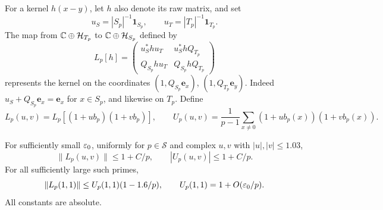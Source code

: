 For a kernel \(h(x-y)\), let \(h\) also denote its raw matrix, and set
\[
 u_S=|S_p|^{-1}\mathbf1_{S_p},\qquad
 u_T=|T_p|^{-1}\mathbf1_{T_p}.
\]
The map from \(\mathbb C\oplus\mathcal H_{T_p}\) to
\(\mathbb C\oplus\mathcal H_{S_p}\) defined by
\[
 L_p[h]=
 \begin{pmatrix}
 u_S^*hu_T&u_S^*hQ_{T_p}\\
 Q_{S_p}hu_T&Q_{S_p}hQ_{T_p}
 \end{pmatrix}
\]
represents the kernel on the coordinates
\((1,Q_{S_p}\mathbf e_x)\), \((1,Q_{T_p}\mathbf e_y)\).
Indeed \(u_S+Q_{S_p}\mathbf e_x=\mathbf e_x\) for \(x\in S_p\),
and likewise on \(T_p\).
Define
\[
 L_p(u,v)=L_p[(1+ub_p)(1+vb_p)],\qquad
 U_p(u,v)=\frac1{p-1}\sum_{x\ne0}(1+ub_p(x))(1+vb_p(x)).
\]

\begin{lemma}\label{lem:supply-local-contraction}
For sufficiently small \(\varepsilon_0\), uniformly for \(p\in\mathcal S\)
and complex \(u,v\) with \(|u|,|v|\le1.03\),
\[
 \|L_p(u,v)\|\le1+C/p,\qquad |U_p(u,v)|\le1+C/p.
\]
For all sufficiently large such primes,
\begin{equation}\label{eq:src31}
 \|L_p(1,1)\|\le U_p(1,1)(1-1.6/p),
 \qquad U_p(1,1)=1+O(\varepsilon_0/p).
\end{equation}
All constants are absolute.
\end{lemma}

